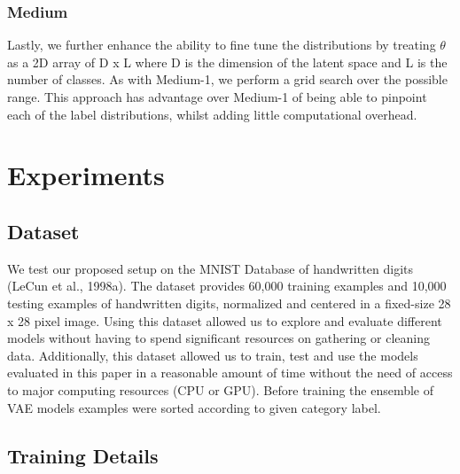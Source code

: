 \documentclass{article}
\begin{document}
\subsubsection{Medium}
Lastly, we further enhance the ability to fine tune the distributions by treating $\theta$ as a 2D array of D x L where D is the dimension of the latent space and L is the number of classes. As with Medium-1, we perform a grid search over the possible range. This approach has advantage over Medium-1 of being able to pinpoint each of the label distributions, whilst adding little computational overhead.
\section{Experiments}
\subsection{Dataset}

We test our proposed setup on the MNIST Database of handwritten digits (LeCun et al., 1998a). The dataset provides 60,000 training examples and 10,000 testing examples of handwritten digits, normalized and centered in a fixed-size 28 x 28 pixel image. Using this dataset allowed us to explore and evaluate different models without having to spend significant resources on gathering or cleaning data. Additionally, this dataset allowed us to train, test and use the models evaluated in this paper in a reasonable amount of time without the need of access to major computing resources (CPU or GPU). Before training the ensemble of VAE models examples were sorted according to given category label.

\subsection{Training Details}
\end{document}
